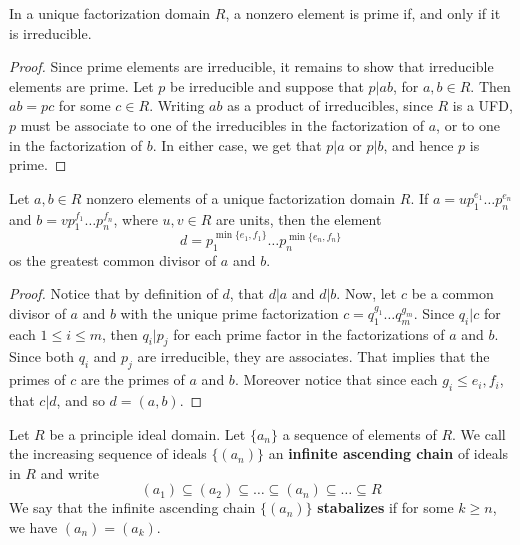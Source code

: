 \begin{lemma}\label{2.3.3}
    In a unique factorization domain $R$, a nonzero element is prime if, and
    only if it is irreducible.
\end{lemma}
\begin{proof}
    Since prime elements are irreducible, it remains to show that irreducible
    elements are prime. Let $p$ be irreducible and suppose that  $p|ab$, for
    $a,b \in R$. Then  $ab=pc$ for some  $c \in R$. Writing  $ab$ as a product
    of irreducibles, since  $R$ is a UFD,  $p$ must be associate to one of the
    irreducibles in the factorization of $a$, or to one in the factorization of
$b$. In either case, we get that $p|a$ or $p|b$, and hence  $p$ is prime.
\end{proof}

\begin{lemma}\label{2.3.4}
    Let $a,b \in R$ nonzero elements of a unique factorization domain $R$. If
    $a=up_1^{e_1} \dots p_n^{e_n}$ and $b=vp_1^{f_1} \dots p_n^{f_n}$, where
    $u,v \in R$ are units, then the element
    \begin{equation*}
        d=p_1^{\min\{e_1,f_1\}} \dots p_n^{\min\{e_n,f_n\}}
    \end{equation*}
    os the greatest common divisor of $a$ and  $b$.
\end{lemma}
\begin{proof}
    Notice that by definition of $d$, that  $d|a$ and  $d|b$. Now, let  $c$ be a
    common divisor of  $a$ and  $b$ with the unique prime factorization
    $c=q_1^{g_1} \dots q_m^{g_m}$. Since $q_i|c$ for each  $1 \leq i \leq m$,
    then  $q_i|p_j$ for each prime factor in the factorizations of  $a$ and
    $b$. Since both  $q_i$ and  $p_j$ are irreducible, they are associates. That
    implies that the primes of  $c$ are the primes of  $a$ and  $b$. Moreover
    notice that since each $g_i \leq e_i,f_i$, that  $c|d$, and so  $d=(a,b)$.
\end{proof}

\begin{definition}
    Let $R$ be a principle ideal domain. Let $\{a_n\}$ a sequence of elements of
    $R$. We call the increasing sequence of ideals  $\{(a_n)\}$ an
    \textbf{infinite ascending chain} of ideals in $R$ and write
    \begin{equation*}
        (a_1) \subseteq (a_2) \subseteq \dots \subseteq (a_n) \subseteq \dots
        \subseteq R
    \end{equation*}
    We say that the infinite ascending chain $\{(a_n)\}$ \textbf{stabalizes} if
    for some $k \geq n$, we have  $(a_n)=(a_k)$.
\end{definition}

